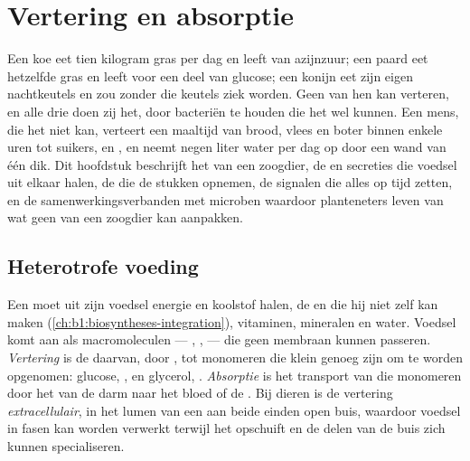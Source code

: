 \chapter{Vertering en absorptie}\label{ch:b1:digestion-absorption}

Een koe eet tien kilogram gras per dag en leeft van azijnzuur; een paard
eet hetzelfde gras en leeft voor een deel van glucose; een konijn eet zijn
eigen nachtkeutels en zou zonder die keutels ziek worden. Geen van hen kan
 verteren, en alle drie doen zij het, door bacteriën te houden die
het wel kunnen. Een mens, die het niet kan, verteert een maaltijd van
brood, vlees en boter binnen enkele uren tot suikers,  en
, en neemt negen liter water per dag op door een wand van één 
dik. Dit hoofdstuk beschrijft het  van een zoogdier,
de  en secreties die voedsel uit elkaar halen, de  die de
stukken opnemen, de signalen die alles op tijd zetten, en de
samenwerkingsverbanden met microben waardoor planteneters leven van wat
geen  van een zoogdier kan aanpakken.

\section{Heterotrofe voeding}

\begin{definition}\label{def:b1:digestion-absorption:nutrition}
Een  moet uit zijn voedsel energie en koolstof halen, de
 en  die hij niet zelf kan maken (\cref{ch:b1:biosyntheses-integration}),
vitaminen, mineralen en water. Voedsel komt aan als macromoleculen ---
, ,  --- die geen membraan kunnen passeren. \emph{Vertering}
is de  daarvan, door , tot monomeren die klein genoeg zijn
om te worden opgenomen: glucose, ,  en glycerol,
. \emph{Absorptie} is het transport van die monomeren door het
 van de darm naar het bloed of de . Bij dieren is de vertering
\emph{extracellulair}, in het lumen van een aan beide einden open buis,
waardoor voedsel in fasen kan worden verwerkt terwijl het opschuift en de
delen van de buis zich kunnen specialiseren.
\end{definition}

